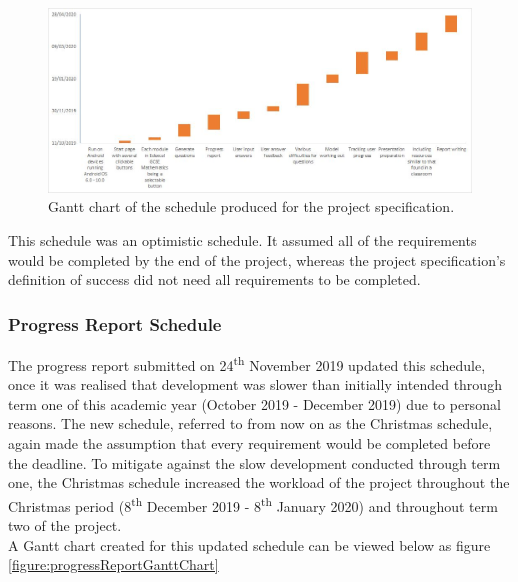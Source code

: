 \documentclass{article}
\begin{document}
\begin{figure}[H]
	\centering
	\includegraphics[width=\linewidth]{./data/projectSpecGanttChart.png}
	\caption{Gantt chart of the schedule produced for the project specification.}
	\label{figure:projectSpecGanttChart}
\end{figure}

This schedule was an optimistic schedule. It assumed all of the requirements would be completed by the end of the project, whereas the project specification's definition of success did not need all requirements to be completed. 

%
%
%

\subsubsection{Progress Report Schedule}

The progress report submitted on 24\textsuperscript{th} November 2019 updated this schedule, once it was realised that development was slower than initially intended through term one of this academic year (October 2019 - December 2019) due to personal reasons. The new schedule, referred to from now on as the Christmas schedule, again made the assumption that every requirement would be completed before the deadline. To mitigate against the slow development conducted through term one, the Christmas schedule increased the workload of the project throughout the Christmas period (8\textsuperscript{th} December 2019 - 8\textsuperscript{th} January 2020) and throughout term two of the project. \\

A Gantt chart created for this updated schedule can be viewed below as figure \ref{figure:progressReportGanttChart}
\end{document}
